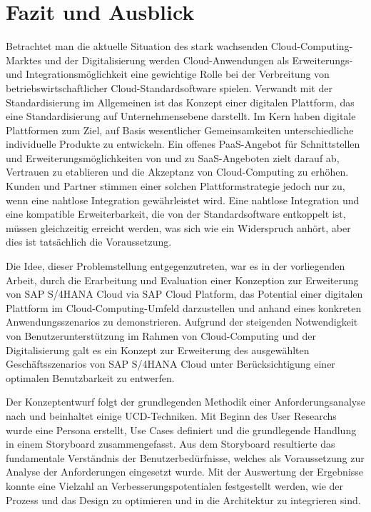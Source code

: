\chapter{Fazit und Ausblick}
Betrachtet man die aktuelle Situation des stark wachsenden Cloud-Computing-Marktes und der Digitalisierung werden Cloud-Anwendungen als Erweiterungs- und Integrationsmöglichkeit eine gewichtige Rolle bei der Verbreitung von betriebswirtschaftlicher Cloud-Standardsoftware spielen. Verwandt mit der Standardisierung im Allgemeinen ist das Konzept einer digitalen Plattform, das eine Standardisierung auf Unternehmensebene darstellt. Im Kern haben digitale Plattformen zum Ziel, auf Basis wesentlicher Gemeinsamkeiten unterschiedliche individuelle Produkte zu entwickeln. Ein offenes \ac{PaaS}-Angebot für Schnittstellen und Erweiterungsmöglichkeiten von und zu \ac{SaaS}-Angeboten zielt darauf ab, Vertrauen zu etablieren und die Akzeptanz von Cloud-Computing zu erhöhen. Kunden und Partner stimmen einer solchen Plattformstrategie jedoch nur zu, wenn eine nahtlose Integration gewährleistet wird. Eine nahtlose Integration und eine kompatible Erweiterbarkeit, die von der Standardsoftware entkoppelt ist, müssen gleichzeitig erreicht werden, was sich wie ein Widerspruch anhört, aber dies ist tatsächlich die Voraussetzung. \autocite{Herzig.2018}

Die Idee, dieser Problemstellung entgegenzutreten, war es in der vorliegenden Arbeit, durch die Erarbeitung und Evaluation einer Konzeption zur Erweiterung von SAP S/4HANA Cloud via SAP Cloud Platform, das Potential einer digitalen Plattform im Cloud-Computing-Umfeld darzustellen und anhand eines konkreten Anwendungsszenarios zu demonstrieren. Aufgrund der steigenden Notwendigkeit von Benutzerunterstützung im Rahmen von Cloud-Computing und der Digitalisierung galt es ein Konzept zur Erweiterung des ausgewählten Geschäftsszenarios von SAP S/4HANA Cloud unter Berücksichtigung einer optimalen Benutzbarkeit zu entwerfen.

Der Konzeptentwurf folgt der grundlegenden Methodik einer Anforderungsanalyse nach \citeauthor{Balzert.2011} und beinhaltet einige \ac{UCD}-Techniken. Mit Beginn des User Researchs wurde eine Persona erstellt, Use Cases definiert und die grundlegende Handlung in einem Storyboard zusammengefasst. Aus dem Storyboard resultierte das fundamentale Verständnis der Benutzerbedürfnisse, welches als Voraussetzung zur Analyse der Anforderungen eingesetzt wurde. Mit der Auswertung der Ergebnisse konnte eine Vielzahl an Verbesserungspotentialen festgestellt werden, wie der Prozess und das Design zu optimieren und in die Architektur zu integrieren sind.


